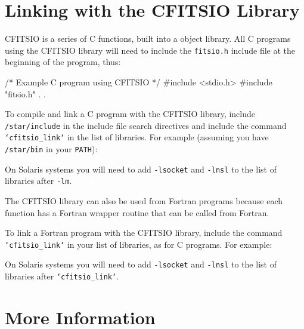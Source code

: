 \documentclass[twoside,11pt,nolof]{starlink}
\begin{document}
\scfrontmatter

\section{Linking with the CFITSIO Library}
\label{linking_the_cfitsio_library}

CFITSIO is a series of C functions, built into a object library.
All C programs using the CFITSIO library will need to include the
\texttt{fitsio.h} include file at the beginning of the program, thus:

\begin{terminalv}
/* Example C program using CFITSIO */
#include <stdio.h>
#include "fitsio.h"
.
.
\end{terminalv}

To compile and link a C program with the CFITSIO library, include
\texttt{/star/include} in the include file search directives and
include the command \texttt{`cfitsio\_link`} in the list of
libraries.  For example (assuming you have \texttt{/star/bin} in your
\texttt{PATH}):

\begin{terminalv}
\end{terminalv}

On Solaris systems you will need to add \texttt{-lsocket} and \texttt{-lnsl} 
to the list of libraries after \texttt{-lm}.

The CFITSIO library can also be used from Fortran programs because each
function has a Fortran wrapper routine that can be called from Fortran.

To link a Fortran program with the CFITSIO library, include the command
\texttt{`cfitsio\_link`} in your list of libraries, as for C programs.
For example:

\begin{terminalv}
\end{terminalv}

On Solaris systems you will need to add \texttt{-lsocket} and \texttt{-lnsl}
to the list of libraries after \texttt{`cfitsio\_link`}.

\section{More Information}
\label{more_information}
\end{document}
